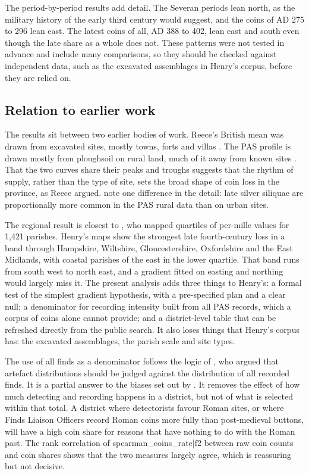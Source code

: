 \documentclass[11pt,a4paper]{article}
\begin{document}
The period-by-period results add detail. The Severan periods lean north, as the military history of the early third century would suggest, and the coins of AD 275 to 296 lean east. The latest coins of all, AD 388 to 402, lean east and south even though the late share as a whole does not. These patterns were not tested in advance and include many comparisons, so they should be checked against independent data, such as the excavated assemblages in Henry's corpus, before they are relied on.

\subsection{Relation to earlier work}
The results sit between two earlier bodies of work. Reece's British mean was drawn from excavated sites, mostly towns, forts and villas \citep{reece1991,reece1995}. The PAS profile is drawn mostly from ploughsoil on rural land, much of it away from known sites \citep{brindle2014}. That the two curves share their peaks and troughs suggests that the rhythm of supply, rather than the type of site, sets the broad shape of coin loss in the province, as Reece argued. \citet{walton2016} note one difference in the detail: late silver siliquae are proportionally more common in the PAS rural data than on urban sites.

The regional result is closest to \citet{henry2024}, who mapped quartiles of per-mille values for 1,421 parishes. Henry's maps show the strongest late fourth-century loss in a band through Hampshire, Wiltshire, Gloucestershire, Oxfordshire and the East Midlands, with coastal parishes of the east in the lower quartile. That band runs from south west to north east, and a gradient fitted on easting and northing would largely miss it. The present analysis adds three things to Henry's: a formal test of the simplest gradient hypothesis, with a pre-specified plan and a clear null; a denominator for recording intensity built from all PAS records, which a corpus of coins alone cannot provide; and a district-level table that can be refreshed directly from the public search. It also loses things that Henry's corpus has: the excavated assemblages, the parish scale and site types.

The use of all finds as a denominator follows the logic of \citet{bevan2012}, who argued that artefact distributions should be judged against the distribution of all recorded finds. It is a partial answer to the biases set out by \citet{robbins2012,robbins2013}. It removes the effect of how much detecting and recording happens in a district, but not of what is selected within that total. A district where detectorists favour Roman sites, or where Finds Liaison Officers record Roman coins more fully than post-medieval buttons, will have a high coin share for reasons that have nothing to do with the Roman past. The rank correlation of {{spearman_coins_rate|f2}} between raw coin counts and coin shares shows that the two measures largely agree, which is reassuring but not decisive.
\end{document}
